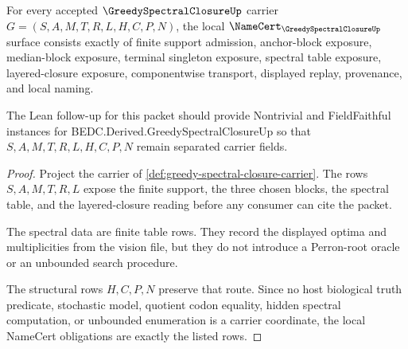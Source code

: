 \begin{theorem}
\label{thm:greedy-spectral-closure-namecert-obligations}
For every accepted $\GreedySpectralClosureUp$ carrier $G=(S,A,M,T,R,L,H,C,P,N)$, the local $\NameCert_{\GreedySpectralClosureUp}$ surface consists exactly of finite support admission, anchor-block exposure, median-block exposure, terminal singleton exposure, spectral table exposure, layered-closure exposure, componentwise transport, displayed replay, provenance, and local naming.

The Lean follow-up for this packet should provide Nontrivial and FieldFaithful instances for BEDC.Derived.GreedySpectralClosureUp so that $S,A,M,T,R,L,H,C,P,N$ remain separated carrier fields.
\end{theorem}
\begin{proof}
Project the carrier of \autoref{def:greedy-spectral-closure-carrier}. The rows $S,A,M,T,R,L$ expose the finite support, the three chosen blocks, the spectral table, and the layered-closure reading before any consumer can cite the packet.

The spectral data are finite table rows. They record the displayed optima and multiplicities from the vision file, but they do not introduce a Perron-root oracle or an unbounded search procedure.

The structural rows $H,C,P,N$ preserve that route. Since no host biological truth predicate, stochastic model, quotient codon equality, hidden spectral computation, or unbounded enumeration is a carrier coordinate, the local NameCert obligations are exactly the listed rows.
\end{proof}

